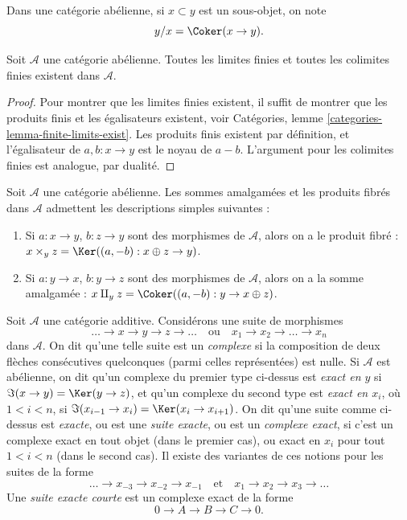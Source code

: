 \noindent
Dans une catégorie abélienne, si $x \subset y$ est un sous-objet,
on note
$$
y/x = \Coker(x \to y).
$$

\begin{lemma}
\label{lemma-colimit-abelian-category}
Soit $\mathcal{A}$ une catégorie abélienne.
Toutes les limites finies et toutes les colimites finies existent dans $\mathcal{A}$.
\end{lemma}

\begin{proof}
Pour montrer que les limites finies existent, il suffit de montrer
que les produits finis et les égalisateurs existent, voir
Catégories, lemme \ref{categories-lemma-finite-limits-exist}.
Les produits finis existent
par définition, et l'égalisateur de $a, b : x \to y$ est
le noyau de $a - b$. L'argument pour les colimites finies
est analogue, par dualité.
\end{proof}

\begin{example}
\label{example-fibre-product-pushouts}
Soit $\mathcal{A}$ une catégorie abélienne.
Les sommes amalgamées et les produits fibrés dans $\mathcal{A}$ admettent les
descriptions simples suivantes :
\begin{enumerate}
\item Si $a : x \to y$, $b : z \to y$ sont des morphismes de $\mathcal{A}$, alors
on a le produit fibré :
$x \times_y z = \Ker((a, -b) : x \oplus z \to y)$.
\item Si $a : y \to x$, $b : y \to z$ sont des morphismes de $\mathcal{A}$, alors
on a la somme amalgamée :
$x \amalg_y z = \Coker((a, -b) : y \to x \oplus z)$.
\end{enumerate}
\end{example}

\begin{definition}
\label{definition-exact}
Soit $\mathcal{A}$ une catégorie additive. Considérons une suite de morphismes
$$
\ldots \to x \to y \to z \to \ldots
\quad\text{ou}\quad
x_1 \to x_2 \to \ldots \to x_n
$$
dans $\mathcal{A}$. On dit qu'une telle suite est un {\it complexe} si la
composition de deux flèches consécutives quelconques (parmi celles représentées) est nulle.
Si $\mathcal{A}$ est abélienne, on dit qu'un complexe du premier
type ci-dessus est {\it exact en $y$} si $\Im(x \to y) = \Ker(y \to z)$,
et qu'un complexe du second type est {\it exact en $x_i$},
où $1 < i < n$, si
$\Im(x_{i - 1} \to x_i) = \Ker(x_i \to x_{i + 1})$. On dit qu'une
suite comme ci-dessus est {\it exacte}, ou est une {\it suite exacte}, ou est un
{\it complexe exact}, si c'est un complexe exact en tout objet (dans
le premier cas), ou exact en $x_i$ pour tout $1 < i < n$ (dans le second cas).
Il existe des variantes de ces notions pour les suites de la forme
$$
\ldots \to x_{-3} \to x_{-2} \to x_{-1}
\quad\text{et}\quad
x_1 \to x_2 \to x_3 \to \ldots
$$
Une {\it suite exacte courte} est un complexe exact de la forme
$$
0 \to A  \to B \to C \to 0.
$$
\end{definition}

